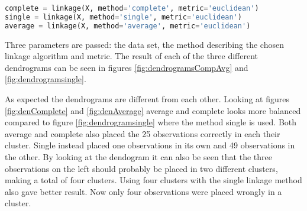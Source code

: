 \begin{lstlisting}[language=Python, label=lst:Linkage, caption=The code that applies the three different linkage on the data set]
complete = linkage(X, method='complete', metric='euclidean')
single = linkage(X, method='single', metric='euclidean') 
average = linkage(X, method='average', metric='euclidean')
\end{lstlisting}

Three parameters are passed: the data set, the method describing the chosen linkage algorithm and metric. The result of each of the three different dendrograms can be seen in figures \ref{fig:dendrogramsCompAvg} and \ref{fig:dendrogramsingle}.







As expected the dendrograms are different from each other.
Looking at figures \ref{fig:denComplete} and \ref{fig:denAverage} average and complete looks more balanced compared to figure \ref{fig:dendrogramsingle} where the method single is used. Both average and complete also placed the 25 observations correctly in each their cluster. Single instead placed one observations in its own and 49 observations in the other. By looking at the dendogram it can also be seen that the three observations on the left should probably be placed in two different clusters, making a total of four clusters. Using four clusters with the single linkage method also gave better result. Now only four observations were placed wrongly in a cluster.